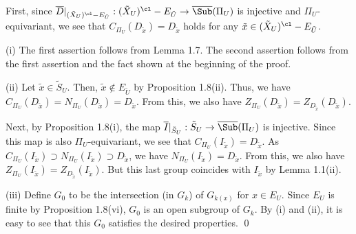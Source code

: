 First, 
since 
$\overline{D}|_{({\tilde X}_U)^{\cl}-E_{\tilde U}}: 
({\tilde X}_U)^{\cl}-E_{\tilde U}\to \overline{\Sub}(\Pi_U)$ 
is injective and $\Pi_U$-equivariant, 
we see that $C_{\Pi_U}(D_{\tilde x})=D_{\tilde x}$ holds 
for any ${\tilde x}\in({\tilde X}_U)^{\cl}-E_{\tilde U}$. 

\noindent 
(i) 
The first assertion follows from Lemma 1.7. The second assertion 
follows from the first assertion and 
the fact shown at the beginning of the proof. 

\noindent
(ii) Let ${\tilde x}\in {\tilde S}_U$. Then, ${\tilde x}\not\in E_{\tilde U}$ 
by Proposition 1.8(ii). Thus, we have 
$C_{\Pi_U}(D_{\tilde x})=N_{\Pi_U}(D_{\tilde x})=D_{\tilde x}$. From this, 
we also have $Z_{\Pi_U}(D_{\tilde x})= Z_{D_{\tilde x}}(D_{\tilde x})$. 

Next, by Proposition 1.8(i), the map 
$\overline{I}|_{{\tilde S}_U}: {\tilde S}_U\to \overline{\Sub}(\Pi_U)$ 
is injective. Since this map is also $\Pi_U$-equivariant, 
we see that $C_{\Pi_U}(I_{\tilde x})=D_{\tilde x}$. As 
$C_{\Pi_U}(I_{\tilde x})\supset N_{\Pi_U}(I_{\tilde x})
\supset D_{\tilde x}$, we have 
$N_{\Pi_U}(I_{\tilde x})=D_{\tilde x}$. From this, 
we also have 
$Z_{\Pi_U}(I_{\tilde x})= Z_{D_{\tilde x}}(I_{\tilde x})$. But this 
last group coincides with $I_{\tilde x}$ by Lemma 1.1(ii). 

\noindent
(iii) Define $G_0$ to be the intersection (in $G_{k}$) of $G_{k(x)}$ 
for $x\in E_U$. Since $E_U$ is finite by Proposition 1.8(vi), 
$G_0$ is an open subgroup of $G_{k}$. By (i) and (ii), it is easy to see 
that this $G_0$ satisfies the desired properties. 
\qed
\enddemo

